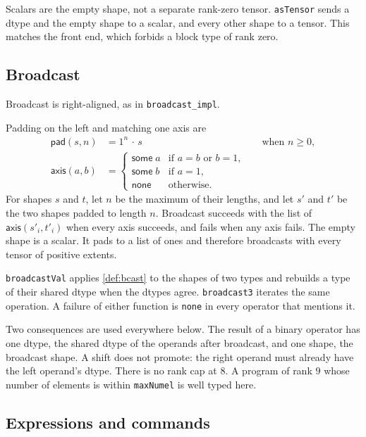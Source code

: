\documentclass[a4paper,UKenglish,anonymous,cleveref,autoref]{lipics-v2021}
\begin{document}
Scalars are the empty shape, not a separate rank-zero tensor.
\texttt{asTensor} sends a dtype and the empty shape to a scalar, and every other shape to a tensor.
This matches the front end, which forbids a block type of rank zero.

\subsection{Broadcast}

Broadcast is right-aligned, as in \texttt{broadcast\_impl}.

\begin{definition}
\label{def:bcast}
Padding on the left and matching one axis are
\[
\begin{aligned}
\mathsf{pad}(s, n) &= 1^{n}\,{\cdot}\,s
&&\text{when } n \ge 0, \\
\mathsf{axis}(a, b) &=
\begin{cases}
\mathsf{some}\;a & \text{if } a = b \text{ or } b = 1, \\
\mathsf{some}\;b & \text{if } a = 1, \\
\mathsf{none} & \text{otherwise.}
\end{cases}
\end{aligned}
\]
For shapes \(s\) and \(t\), let \(n\) be the maximum of their lengths, and let \(s'\) and \(t'\) be the two shapes padded to length \(n\).
Broadcast succeeds with the list of \(\mathsf{axis}(s'_i, t'_i)\) when every axis succeeds, and fails when any axis fails.
The empty shape is a scalar.
It pads to a list of ones and therefore broadcasts with every tensor of positive extents.
\end{definition}

\texttt{broadcastVal} applies \cref{def:bcast} to the shapes of two types and rebuilds a type of their shared dtype when the dtypes agree.
\texttt{broadcast3} iterates the same operation.
A failure of either function is \texttt{none} in every operator that mentions it.

Two consequences are used everywhere below.
The result of a binary operator has one dtype, the shared dtype of the operands after broadcast, and one shape, the broadcast shape.
A shift does not promote: the right operand must already have the left operand's dtype.
There is no rank cap at \(8\).
A program of rank \(9\) whose number of elements is within \texttt{maxNumel} is well typed here.

\subsection{Expressions and commands}
\end{document}
